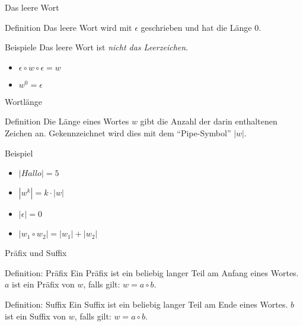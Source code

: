 \begin{frame}{Das leere Wort}
    \begin{block}{Definition}
        Das leere Wort wird mit $\epsilon$ geschrieben und hat die Länge $0$.
    \end{block}
    \begin{exampleblock}{Beispiele}
        Das leere Wort ist \emph{nicht das Leerzeichen}. 
        \begin{itemize}
            \item $\epsilon \circ w \circ \epsilon = w$
            \item $w^0 = \epsilon$
        \end{itemize}
    \end{exampleblock}
\end{frame}

\begin{frame}{Wortlänge}
    \begin{block}{Definition}
        Die Länge eines Wortes $w$ gibt die Anzahl der darin enthaltenen Zeichen an. Gekennzeichnet wird dies mit dem "`Pipe-Symbol"' $\left| w \right|$.
    \end{block}
    \begin{exampleblock}{Beispiel}
        \begin{itemize}
            \item $\left| Hallo\right| = 5$
                \pause
            \item $\left| w^k\right| = k\cdot \left| w\right|$
                \pause
            \item $\left| \epsilon\right| = 0$
                \pause
            \item $\left| w_1 \circ w_2 \right| = \left| w_1\right| + \left| w_2\right|$
        \end{itemize}
    \end{exampleblock}
\end{frame}

\begin{frame}{Präfix und Suffix}
    \begin{block}{Definition: Präfix}
        Ein Präfix ist ein beliebig langer Teil am Anfang eines Wortes. $a$ ist ein Präfix von $w$, falls gilt: $w = a \circ b$.
    \end{block}
    \pause
    \begin{block}{Definition: Suffix}
        Ein Suffix ist ein beliebig langer Teil am Ende eines Wortes. $b$ ist ein Suffix von $w$, falls gilt: $w = a\circ b$.
    \end{block}
\end{frame}

